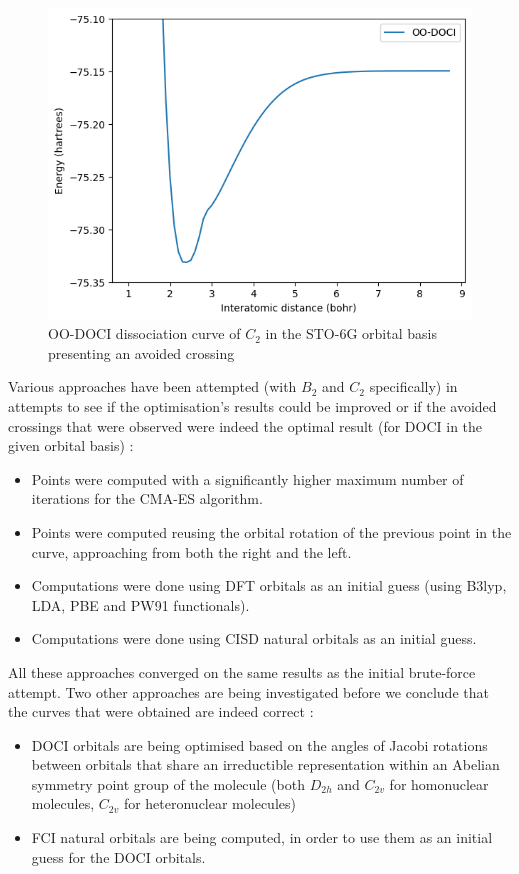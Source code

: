 \documentclass[twoside,twocolumn,9pt]{article}
\begin{document}
\begin{figure}
  \includegraphics[width=\linewidth]{C2.png}
  \caption{OO-DOCI dissociation curve of $C_2$ in the STO-6G orbital basis presenting an avoided crossing}\label{C2}
\end{figure}

Various approaches have been attempted (with $B_2$ and $C_2$ specifically) in attempts to see if the optimisation's results could be improved or if the avoided crossings that were observed were indeed the optimal result (for DOCI in the given orbital basis) :

\begin{itemize}
  \item Points were computed with a significantly higher maximum number of iterations for the CMA-ES algorithm.
  \item Points were computed reusing the orbital rotation of the previous point in the curve, approaching from both the right and the left.
  \item Computations were done using DFT orbitals as an initial guess (using B3lyp, LDA, PBE and PW91 functionals).
  \item Computations were done using CISD natural orbitals as an initial guess.
\end{itemize}

All these approaches converged on the same results as the initial brute-force attempt. Two other approaches are being investigated before we conclude that the curves that were obtained are indeed correct :

\begin{itemize}
  \item DOCI orbitals are being optimised based on the angles of Jacobi rotations between orbitals that share an irreductible representation within an Abelian symmetry point group of the molecule (both $D_{2h}$ and $C_{2v}$ for homonuclear molecules, $C_{2v}$ for heteronuclear molecules)
  \item FCI natural orbitals are being computed, in order to use them as an initial guess for the DOCI orbitals.
\end{itemize}
\end{document}
